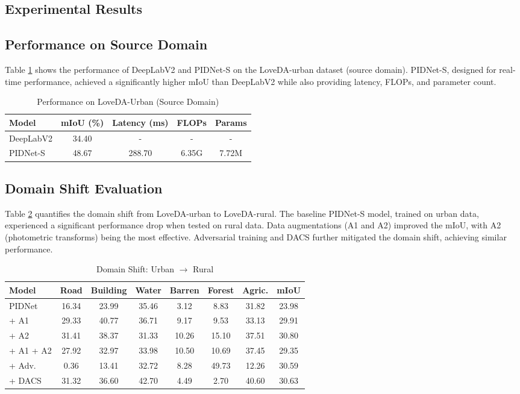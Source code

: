 \documentclass{article}
\begin{document}
\begin{multicols}{2}
		\section{Experimental Results}
		\subsection{Performance on Source Domain}
		Table \ref{tab:urban} shows the performance of DeepLabV2 and PIDNet-S on the LoveDA-urban dataset (source domain). PIDNet-S, designed for real-time performance, achieved a significantly higher mIoU than DeepLabV2 while also providing latency, FLOPs, and parameter count.
		
		\begin{table}[h]
			\centering
			\caption{Performance on LoveDA-Urban (Source Domain)}
			\label{tab:urban}
			\begin{tabular}{|l|c|c|c|c|}
				\hline
				Model & mIoU (\%) & Latency (ms) & FLOPs & Params \\ \hline
				DeepLabV2 & 34.40 & - & - & - \\ \hline
				PIDNet-S & 48.67 & 288.70 & 6.35G & 7.72M \\ \hline
			\end{tabular}
		\end{table}
		
		\subsection{Domain Shift Evaluation}
		Table \ref{tab:shift} quantifies the domain shift from LoveDA-urban to LoveDA-rural. The baseline PIDNet-S model, trained on urban data, experienced a significant performance drop when tested on rural data. Data augmentations (A1 and A2) improved the mIoU, with A2 (photometric transforms) being the most effective. Adversarial training and DACS further mitigated the domain shift, achieving similar performance.
		
		\begin{table}[h]
			\centering
			\caption{Domain Shift: Urban $\rightarrow$ Rural}
			\label{tab:shift}
			\begin{tabular}{|l|c|c|c|c|c|c|c|}
				\hline
				Model & Road & Building & Water & Barren & Forest & Agric. & mIoU \\ \hline
				PIDNet & 16.34 & 23.99 & 35.46 & 3.12 & 8.83 & 31.82 & 23.98 \\ \hline
				+ A1 & 29.33 & 40.77 & 36.71 & 9.17 & 9.53 & 33.13 & 29.91 \\ \hline
				+ A2 & 31.41 & 38.37 & 31.33 & 10.26 & 15.10 & 37.51 & 30.80 \\ \hline
				+ A1 + A2 & 27.92 & 32.97 & 33.98 & 10.50 & 10.69 & 37.45 & 29.35 \\ \hline
				+ Adv. & 0.36 & 13.41 & 32.72 & 8.28 & 49.73 & 12.26 & 30.59 \\ \hline
				+ DACS & 31.32 & 36.60 & 42.70 & 4.49 & 2.70 & 40.60 & 30.63 \\ \hline
			\end{tabular}
		\end{table}
		

\end{multicols}
\end{document}
